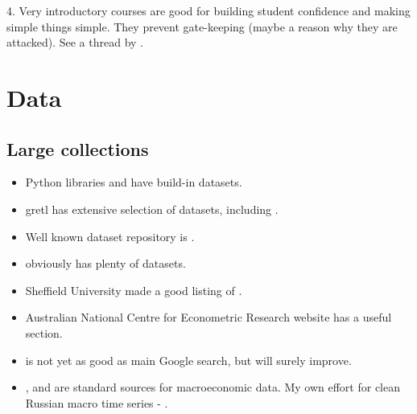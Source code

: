 \documentclass[letterpaper,10pt,english]{sphinxmanual}
\begin{document}
 

4. Very introductory courses are good for building student confidence and making simple things simple. They prevent gate-keeping (maybe a reason why they are attacked). See a thread by
.


\chapter{Data}
\label{\detokenize{data:data}}\label{\detokenize{data::doc}}

\section{Large collections}
\label{\detokenize{data:large-collections}}\begin{itemize}
\item {} 
Python libraries 
and  have build-in datasets.

\item {} 
gretl has extensive selection of datasets, including .

\item {} 
Well known dataset repository is .

\item {} 
 obviously has plenty of datasets.

\item {} 
Sheffield University made a good  listing of .

\item {} 
Australian National Centre for Econometric Research website has
a useful 
section.

\item {} 
 is not yet as good as
main Google search, but will surely improve.

\item {} 
,  and  are standard sources for macroeconomic data. My own effort for clean Russian macro time series - .

\end{itemize}
\end{document}
